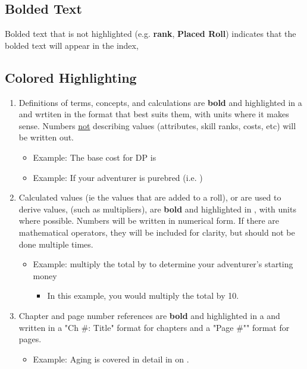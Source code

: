 \subsection{Bolded Text}
Bolded text that is not highlighted (e.g. \textbf{rank}, \textbf{Placed Roll}) indicates that the bolded text will appear in the index, 
\subsection{Colored Highlighting}
\begin{enumerate}[leftmargin=12pt]
\item Definitions of terms, concepts, and calculations are \textbf{bold} and highlighted in a   and wrtiten in the format that best suits them, with units where it makes sense. Numbers \uline{not} describing values (attributes, skill ranks, costs, etc) will be written out.
	\begin{itemize}\item Example: The base cost for DP is \end{itemize}
	\begin{itemize}\item Example: If your adventurer is purebred (i.e. )\end{itemize}
\item Calculated values (ie the values that are added to a roll), or are used to derive values, (such as multipliers), are \textbf{bold} and highlighted in  , with units where possible. Numbers will be written in numerical form. If there are mathematical operators, they will be included for clarity, but should not be done multiple times.
	\begin{itemize}\item Example: multiply the total by  to determine your adventurer's starting money
		\begin{itemize}\item In this example, you would multiply the total by 10.\end{itemize}
	\end{itemize}
\item Chapter and page number references are \textbf{bold} and highlighted in a   and written in a "Ch \#: Title" format for chapters and a "Page \#"" format for pages.
	\begin{itemize}\item Example: Aging is covered in detail in  on .\end{itemize}

\end{enumerate}
